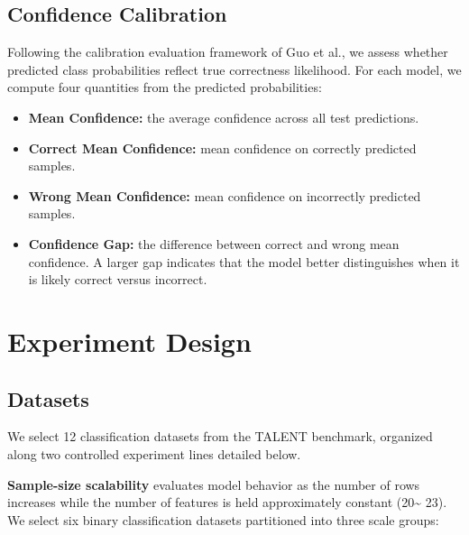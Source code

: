 \documentclass{SYSUReport}
\begin{document}
\subsection{Confidence Calibration}
Following the calibration evaluation framework of Guo et al.\cite{guo2017calibration}, we assess whether predicted class probabilities reflect true correctness likelihood. For each model, we compute four quantities from the predicted probabilities:
\begin{itemize}
    \item \textbf{Mean Confidence:} the average confidence across all test predictions.
    \item \textbf{Correct Mean Confidence:} mean confidence on correctly predicted samples.
    \item \textbf{Wrong Mean Confidence:} mean confidence on incorrectly predicted samples.
    \item \textbf{Confidence Gap:} the difference between correct and wrong mean confidence. A larger gap indicates that the model better distinguishes when it is likely correct versus incorrect.
\end{itemize}





\section{Experiment Design}
\subsection{Datasets}
We select 12 classification datasets from the TALENT benchmark, organized along two controlled experiment lines detailed below.

\textbf{Sample-size scalability} evaluates model behavior as the number of rows increases while the number of features is held approximately constant (20\textasciitilde{} 23). We select six binary classification datasets partitioned into three scale groups:
\end{document}
